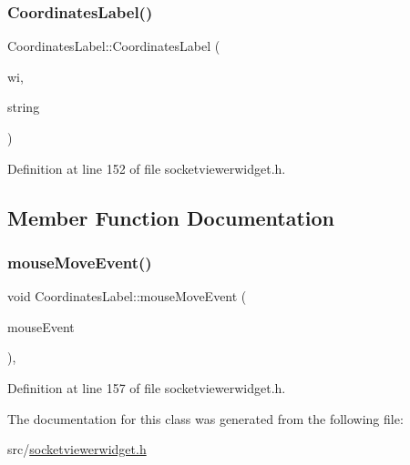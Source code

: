\subsubsection{\texorpdfstring{CoordinatesLabel()}{CoordinatesLabel()}}
{\footnotesize\ttfamily Coordinates\+Label\+::\+Coordinates\+Label (\begin{DoxyParamCaption}\item[{\mbox{\hyperlink{class_socket_viewer_widget}{Socket\+Viewer\+Widget}} $\ast$}]{wi,  }\item[{Q\+String}]{string }\end{DoxyParamCaption})\hspace{0.3cm}{\ttfamily [inline]}}



Definition at line 152 of file socketviewerwidget.\+h.



\subsection{Member Function Documentation}
\mbox{\label{class_coordinates_label_acc2d36255eb21eb37cae85de5d88c439}} 
\subsubsection{\texorpdfstring{mouseMoveEvent()}{mouseMoveEvent()}}
{\footnotesize\ttfamily void Coordinates\+Label\+::mouse\+Move\+Event (\begin{DoxyParamCaption}\item[{Q\+Mouse\+Event $\ast$}]{mouse\+Event }\end{DoxyParamCaption})\hspace{0.3cm}{\ttfamily [inline]}, {\ttfamily [protected]}}



Definition at line 157 of file socketviewerwidget.\+h.



The documentation for this class was generated from the following file\+:\begin{DoxyCompactItemize}
\item 
src/\mbox{\hyperlink{socketviewerwidget_8h}{socketviewerwidget.\+h}}\end{DoxyCompactItemize}
